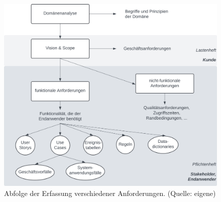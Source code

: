 \begin{figure}
    \centering
    \includegraphics[scale=0.35]{chapters/Requirements Engineering/img/anforderung}
    \caption{Abfolge der Erfassung verschiedener Anforderungen. (Quelle: eigene)}
    \label{fig:anforderung}
\end{figure}